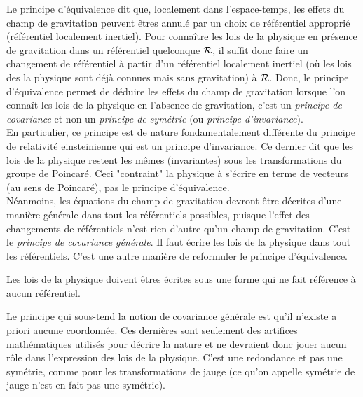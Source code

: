 \documentclass[a4paper,11pt]{report}
\begin{document}
            Le principe d'équivalence dit que, localement dans l'espace-temps, les effets du champ de gravitation peuvent êtres annulé par un choix de référentiel approprié (référentiel localement inertiel). Pour connaître les lois de la physique en présence de gravitation dans un référentiel quelconque $\mathcal{R}$, il suffit donc faire un changement de référentiel à partir d'un référentiel localement inertiel (où les lois des la physique sont déjà connues mais sans gravitation) à $\mathcal{R}$. Donc, le principe d'équivalence permet de déduire les effets du champ de gravitation lorsque l'on connaît les lois de la physique en l'absence de gravitation, c'est un \textit{principe de covariance} et non un \textit{principe de symétrie} (ou \textit{principe d'invariance}).\\
            
            En particulier, ce principe est de nature fondamentalement différente du principe de relativité einsteinienne qui est un principe d'invariance. Ce dernier dit que les lois de la physique restent les mêmes (invariantes) sous les transformations du groupe de Poincaré. Ceci "contraint" la physique à s'écrire en terme de vecteurs (au sens de Poincaré), pas le principe d'équivalence.\\
            
            Néanmoins, les équations du champ de gravitation devront être décrites d'une manière générale dans tout les référentiels possibles, puisque l'effet des changements de référentiels n'est rien d'autre qu'un champ de gravitation. C'est le \textit{principe de covariance générale}. Il faut écrire les lois de la physique dans tout les référentiels. C'est une autre manière de reformuler le principe d'équivalence.
            
            \begin{prin}
            \begin{leftbar}
            Les lois de la physique doivent êtres écrites sous une forme qui ne fait référence à aucun référentiel.
            \end{leftbar}
            \end{prin}
            
            Le principe qui sous-tend la notion de covariance générale est qu'il n'existe a priori aucune coordonnée. Ces dernières sont seulement des artifices mathématiques utilisés pour décrire la nature et ne devraient donc jouer aucun rôle dans l'expression des lois de la physique. C'est une redondance et pas une symétrie, comme pour les transformations de jauge (ce qu'on appelle symétrie de jauge n'est en fait pas une symétrie).
    
\end{document}
